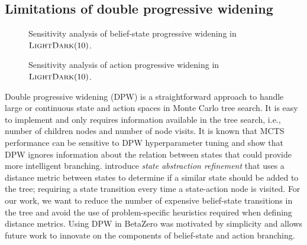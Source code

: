 \subsection*{Limitations of double progressive widening}

\begin{figure}[b!]
    \centering
    \begin{minipage}{0.49\linewidth}
        \resizebox{\linewidth}{!}{
            
    }
    \end{minipage}%
    \hspace*{3mm} %
    \begin{minipage}{0.49\linewidth}
        \resizebox{\linewidth}{!}{%
            
        }
    \end{minipage}

    \begin{minipage}[t]{0.49\linewidth}
        \caption{Sensitivity analysis of belief-state progressive widening in $\textsc{LightDark}(10)$.}
        \label{fig:spw_sensitivity_ld10}
    \end{minipage}%
    \hspace*{3mm} %
    \begin{minipage}[t]{0.49\linewidth}
        \caption{Sensitivity analysis of action progressive widening in $\textsc{LightDark}(10)$.}
        \label{fig:apw_sensitivity_ld10}
    \end{minipage}
\end{figure}

Double progressive widening (DPW) is a straightforward approach to handle large or continuous state and action spaces in Monte Carlo tree search.
It is easy to implement and only requires information available in the tree search, i.e., number of children nodes and number of node visits.
It is known that MCTS performance can be sensitive to DPW hyperparameter tuning and \citeauthor{sokota2021monte} show that DPW ignores information about the relation between states that could provide more intelligent branching.
\citeauthor{sokota2021monte} introduce \textit{state abstraction refinement} that uses a distance metric between states to determine if a similar state should be added to the tree; requiring a state transition every time a state-action node is visited.
For our work, we want to reduce the number of expensive belief-state transitions in the tree and avoid the use of problem-specific heuristics required when defining distance metrics.
Using DPW in BetaZero was motivated by simplicity and allows future work to innovate on the components of belief-state and action branching.

